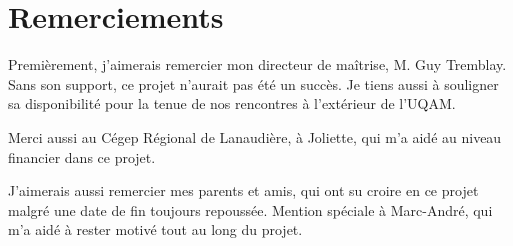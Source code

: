 \chapter*{Remerciements}

Premi\`erement, j'aimerais remercier mon directeur de ma\^itrise, M. Guy Tremblay.
Sans son support, ce projet n'aurait pas \'et\'e un succ\`es.
Je tiens aussi \`a souligner sa disponibilit\'e pour la tenue de nos rencontres \`a l'ext\'erieur de l'UQAM.

Merci aussi au C\'egep R\'egional de Lanaudi\`ere, \`a Joliette, qui m'a aid\'e au niveau financier dans ce projet.

J'aimerais aussi remercier mes parents et amis, qui ont su croire en ce projet malgr\'e une date de fin toujours repouss\'ee.
Mention sp\'eciale \`a Marc-Andr\'e, qui m'a aid\'e \`a rester motiv\'e tout au long du projet.
